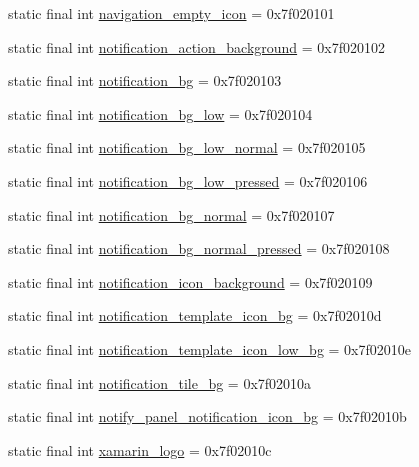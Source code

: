 \begin{CompactItemize}
\item 
static final int \hyperlink{classandroid_1_1support_1_1graphics_1_1drawable_1_1_r_1_1drawable_13694357c82067f874c2d97e84cb86a6}{navigation\_\-empty\_\-icon} = 0x7f020101
\item 
static final int \hyperlink{classandroid_1_1support_1_1graphics_1_1drawable_1_1_r_1_1drawable_6beb62c990b32b7c4d4cb69f48100da9}{notification\_\-action\_\-background} = 0x7f020102
\item 
static final int \hyperlink{classandroid_1_1support_1_1graphics_1_1drawable_1_1_r_1_1drawable_b1dff4311386d64e837206a20d6cd7b2}{notification\_\-bg} = 0x7f020103
\item 
static final int \hyperlink{classandroid_1_1support_1_1graphics_1_1drawable_1_1_r_1_1drawable_1bf4bfae9f43eb8b92e87a7d826c05d8}{notification\_\-bg\_\-low} = 0x7f020104
\item 
static final int \hyperlink{classandroid_1_1support_1_1graphics_1_1drawable_1_1_r_1_1drawable_b8a116392993c4e5a26778386c8c5be4}{notification\_\-bg\_\-low\_\-normal} = 0x7f020105
\item 
static final int \hyperlink{classandroid_1_1support_1_1graphics_1_1drawable_1_1_r_1_1drawable_7b273cfcd1e1ca941268775ea85bf4e4}{notification\_\-bg\_\-low\_\-pressed} = 0x7f020106
\item 
static final int \hyperlink{classandroid_1_1support_1_1graphics_1_1drawable_1_1_r_1_1drawable_01690cff98e4458abfa4086e8d7f7596}{notification\_\-bg\_\-normal} = 0x7f020107
\item 
static final int \hyperlink{classandroid_1_1support_1_1graphics_1_1drawable_1_1_r_1_1drawable_3e5377a43a36fa4355d7e4f1aacbb108}{notification\_\-bg\_\-normal\_\-pressed} = 0x7f020108
\item 
static final int \hyperlink{classandroid_1_1support_1_1graphics_1_1drawable_1_1_r_1_1drawable_433a7de56d6b01df7c5542bb0bea7739}{notification\_\-icon\_\-background} = 0x7f020109
\item 
static final int \hyperlink{classandroid_1_1support_1_1graphics_1_1drawable_1_1_r_1_1drawable_5f7b0ee37fb6cb4d9bfabf1c8738ca12}{notification\_\-template\_\-icon\_\-bg} = 0x7f02010d
\item 
static final int \hyperlink{classandroid_1_1support_1_1graphics_1_1drawable_1_1_r_1_1drawable_458f22bba25f01aeefa6789ef2cfa806}{notification\_\-template\_\-icon\_\-low\_\-bg} = 0x7f02010e
\item 
static final int \hyperlink{classandroid_1_1support_1_1graphics_1_1drawable_1_1_r_1_1drawable_d16b8e31a045d15e8e4363926a5871b3}{notification\_\-tile\_\-bg} = 0x7f02010a
\item 
static final int \hyperlink{classandroid_1_1support_1_1graphics_1_1drawable_1_1_r_1_1drawable_411decec38a2019abfee90d0d8f8a02e}{notify\_\-panel\_\-notification\_\-icon\_\-bg} = 0x7f02010b
\item 
static final int \hyperlink{classandroid_1_1support_1_1graphics_1_1drawable_1_1_r_1_1drawable_7dee181dfe9fa76c2aeeaa4930cfe4db}{xamarin\_\-logo} = 0x7f02010c
\end{CompactItemize}


